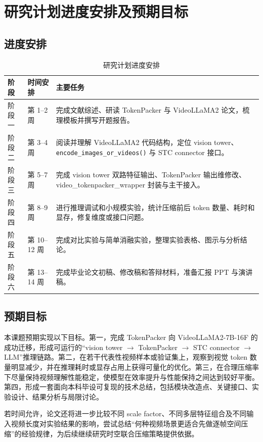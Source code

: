 \section{研究计划进度安排及预期目标}

\subsection{进度安排}

\begin{table}[H]
    \centering
    \small
    \renewcommand{\arraystretch}{1.15}
    \caption{研究计划进度安排}
    \begin{tabularx}{\textwidth}{p{}p{}X}
        \toprule
        阶段 & 时间安排 & 主要任务 \\
        \midrule
        阶段一 & 第 1--2 周 & 完成文献综述、研读 TokenPacker 与 VideoLLaMA2 论文，梳理模板并撰写开题报告。 \\
        阶段二 & 第 3--4 周 & 阅读并理解 VideoLLaMA2 代码结构，定位 vision tower、\texttt{encode\_images\_or\_videos()} 与 STC connector 接口。 \\
        阶段三 & 第 5--7 周 & 完成 vision tower 双路特征输出、TokenPacker 输出维修改、video\_tokenpacker\_wrapper 封装与主干接入。 \\
        阶段四 & 第 8--9 周 & 进行推理调试和小规模实验，统计压缩前后 token 数量、耗时和显存，修复维度或接口问题。 \\
        阶段五 & 第 10--12 周 & 完成对比实验与简单消融实验，整理实验表格、图示与分析结论。 \\
        阶段六 & 第 13--14 周 & 完成毕业论文初稿、修改稿和答辩材料，准备汇报 PPT 与演讲稿。 \\
        \bottomrule
    \end{tabularx}
\end{table}

\subsection{预期目标}

本课题预期实现以下目标。第一，完成 TokenPacker 向 VideoLLaMA2-7B-16F 的成功迁移，形成可运行的“vision tower $\to$ TokenPacker $\to$ STC connector $\to$ LLM”推理链路。第二，在若干代表性视频样本或验证集上，观察到视觉 token 数量明显减少，并在推理耗时或显存占用上获得可量化的优化。第三，在合理压缩率下尽量保持视频理解性能稳定，使模型在效率提升与性能保持之间达到较好平衡。第四，形成一套面向本科毕设可复现的技术总结，包括模块改造点、关键接口、实验设计、结果分析与局限讨论。

若时间允许，论文还将进一步比较不同 scale factor、不同多层特征组合及不同输入视频长度对实验结果的影响，尝试总结“何种视频场景更适合先做逐帧空间压缩”的经验规律，为后续继续研究时空联合压缩策略提供依据。
